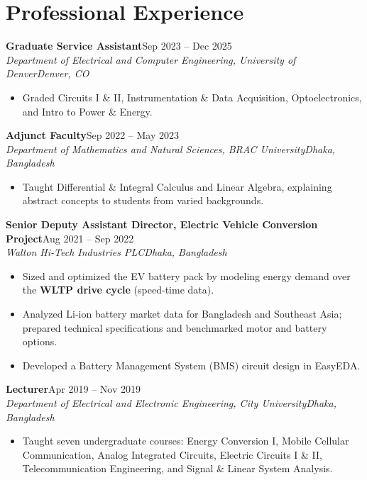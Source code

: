 \documentclass[10pt,letterpaper]{article}
\newcommand{\entry}[4]{\textbf{#1}\hfill #2\\\textit{#3}\hfill\textit{#4}\par}
\begin{document}
\section*{Professional Experience}
\entry{Graduate Service Assistant}{Sep 2023 – Dec 2025}{Department of Electrical and Computer Engineering, University of Denver}{Denver, CO}
\begin{itemize}\item Graded Circuits I \& II, Instrumentation \& Data Acquisition, Optoelectronics, and Intro to Power \& Energy.\end{itemize}
\vspace{2pt}
\entry{Adjunct Faculty}{Sep 2022 – May 2023}{Department of Mathematics and Natural Sciences, BRAC University}{Dhaka, Bangladesh}
\begin{itemize}\item Taught Differential \& Integral Calculus and Linear Algebra, explaining abstract concepts to students from varied backgrounds.\end{itemize}
\vspace{2pt}
\entry{Senior Deputy Assistant Director, Electric Vehicle Conversion Project}{Aug 2021 – Sep 2022}{Walton Hi-Tech Industries PLC}{Dhaka, Bangladesh}
\begin{itemize}\item Sized and optimized the EV battery pack by modeling energy demand over the \textbf{WLTP drive cycle} (speed-time data).\item Analyzed Li-ion battery market data for Bangladesh and Southeast Asia; prepared technical specifications and benchmarked motor and battery options.\item Developed a Battery Management System (BMS) circuit design in EasyEDA.\end{itemize}
\vspace{2pt}
\entry{Lecturer}{Apr 2019 – Nov 2019}{Department of Electrical and Electronic Engineering, City University}{Dhaka, Bangladesh}
\begin{itemize}\item Taught seven undergraduate courses: Energy Conversion I, Mobile Cellular Communication, Analog Integrated Circuits, Electric Circuits I \& II, Telecommunication Engineering, and Signal \& Linear System Analysis.\end{itemize}
\vspace{2pt}
\end{document}
